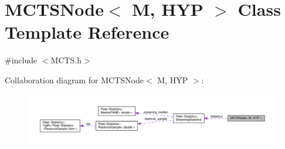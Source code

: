 \hypertarget{class_m_c_t_s_node}{}\section{M\+C\+T\+S\+Node$<$ M, H\+YP $>$ Class Template Reference}
\label{class_m_c_t_s_node}


{\ttfamily \#include $<$M\+C\+T\+S.\+h$>$}



Collaboration diagram for M\+C\+T\+S\+Node$<$ M, H\+YP $>$\+:
\nopagebreak
\begin{figure}[H]
\begin{center}
\leavevmode
\includegraphics[width=350pt]{class_m_c_t_s_node__coll__graph}
\end{center}
\end{figure}
